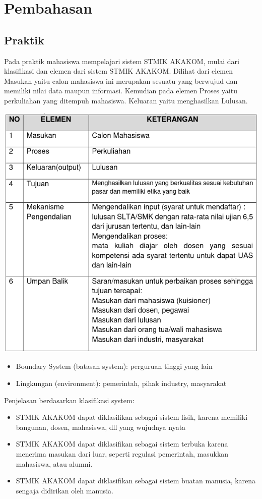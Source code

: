 \documentclass[a4paper,12pt]{article}
\begin{document}
\section{Pembahasan}
\subsection{Praktik}
Pada praktik mahasiswa mempelajari sistem STMIK AKAKOM, mulai dari klasifikasi dan elemen dari sistem STMIK AKAKOM.
Dilihat dari elemen Masukan yaitu calon mahasiswa ini merupakan sesuatu yang berwujud dan memiliki nilai data maupun informasi. Kemudian pada elemen Proses yaitu perkuliahan yang ditempuh mahasiswa. Keluaran yaitu menghasilkan Lulusan.
\begin{center}
    \includegraphics[width=\textwidth]{tbl1} 
\end{center}
\begin{itemize}
    \item Boundary System (batasan system): perguruan tinggi yang lain
    \item Lingkungan (environment): pemerintah, pihak industry, masyarakat
\end{itemize}
Penjelasan berdasarkan klasifikasi system:\\
\begin{itemize}
   \item STMIK AKAKOM dapat diklasifikan sebagai sistem fisik, karena memiliki bangunan, dosen, mahasiswa, dll yang
       wujudnya nyata
    \item STMIK AKAKOM dapat diklasifikan sebagai sistem terbuka karena menerima masukan dari luar, seperti regulasi
        pemerintah, masukkan mahasiswa, atau alumni.
    \item STMIK AKAKOM dapat diklasifikan sebagai sistem buatan manusia, karena sengaja didirikan oleh manusia.
\end{itemize}
\end{document}
